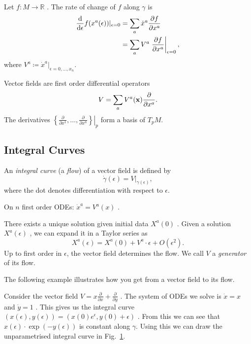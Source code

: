 Let $f\colon M \to \mathbb{R}$ . The rate of change of $f$  along $ \gamma$ is
\begin{align}
  \dv{}{\epsilon} f(x^{a}(\epsilon)) \rvert_{\epsilon =0} &= \sum_a \dot{x}^{a} \frac{\partial f}{\partial x^{a}} \\
						      &= \sum_a V^{a} \left. \frac{\partial f}{\partial x^{a}}\right\rvert_{\epsilon=0},
\end{align}
where $V^{a} \coloneqq \dot{x}^{a}\rvert_{\epsilon=0, \dots, x_n}$.

Vector fields are first order differential operators
\begin{equation}
  V = \sum_a V^{a}(\vb{x}) \frac{\partial }{\partial x^{a}}.
\end{equation}
The derivatives $\left.\left\{ \frac{\partial }{\partial x^1}, \dots, \frac{\partial }{\partial x^{n}} \right\} \right\rvert_p$ form a basis of $T_p M$. 

\subsection{Integral Curves}%
\label{sub:integral_curves}

\begin{definition}
  An \emph{integral curve} (a \emph{flow}) of a vector field is defined by
  \begin{equation}
    \dot{\gamma} (\epsilon) = V \rvert_{\gamma(\epsilon)},
  \end{equation}
  where the dot denotes differentiation with respect to $\epsilon$.
\end{definition}

On $n$  first order ODEs: $\dot{x}^{a} = V^{a} (x)$ .

There exists a unique solution given initial data $X^{a} (0)$ .
Given a solution $X^{a}(\epsilon)$ , we can expand it in a Taylor series as
\begin{equation}
  X^{a}(\epsilon) = X^{a}(0) + V^{a} \cdot \epsilon + O(\epsilon^2).
\end{equation}
Up to first order in $\epsilon$, the vector field determines the flow.
We call  $V$  a \emph{generator} of its flow.

The following example illustrates how you get from a vector field to its flow.
\begin{example}[$M = \mathbb{R}^2$, $x^{a} = (x, y)$]
  Consider the vector field $V = x \frac{\partial }{\partial x} + \frac{\partial }{\partial y}$ .
  The system of ODEs we solve is $\dot{x} = x$ and $\dot{y} = 1$ .
  This gives us the integral curve $(x(\epsilon), y(\epsilon)) = (x(0)e^\epsilon, y(0) + \epsilon)$ .
  From this we can see that $x(\epsilon) \cdot \exp(-y (\epsilon))$  is constant along $\gamma$.
  Using this we can draw the unparametrised integral curve in Fig.~\ref{fig:l2f3}.
   \begin{figure}[tbhp]
    \centering
    \def\svgwidth{0.4\columnwidth}
    
    \caption{}
    \label{fig:l2f3}
  \end{figure}
\end{example}

